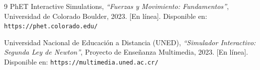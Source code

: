 \documentclass[11pt,a4paper]{article}
\begin{document}
\clearpage
\begin{thebibliography}{9}
PhET Interactive Simulations, 
\textit{``Fuerzas y Movimiento: Fundamentos''}, 
Universidad de Colorado Boulder, 2023. [En línea]. Disponible en: \texttt{https://phet.colorado.edu/}

Universidad Nacional de Educación a Distancia (UNED), 
\textit{``Simulador Interactivo: Segunda Ley de Newton''}, 
Proyecto de Enseñanza Multimedia, 2023. [En línea]. Disponible en: \texttt{https://multimedia.uned.ac.cr/}
\end{thebibliography}
\end{document}
